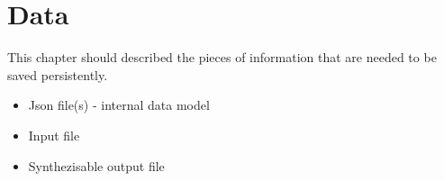 \documentclass[a4paper]{scrreprt}
\newenvironment{user-story}[1]{\begin{lrbox}
		{\mybox}\begin{minipage}[t]{5in}\begin{center}\begin{minipage}[t]{5in}\begin{description}\item[{ID: }] #1 \label{ustory:#1}}
		{\end{description}\end{minipage}\end{center}\end{minipage}\end{lrbox}\fbox{\usebox{\mybox}}}
\begin{document}
 
% 
%
%

\chapter{Data}
This chapter should described the pieces of information that are needed to be saved persistently.

\begin{itemize}
  \item Json file(s) - internal data model
  \item Input file
  \item Synthezisable output file
\end{itemize}
\end{document}
